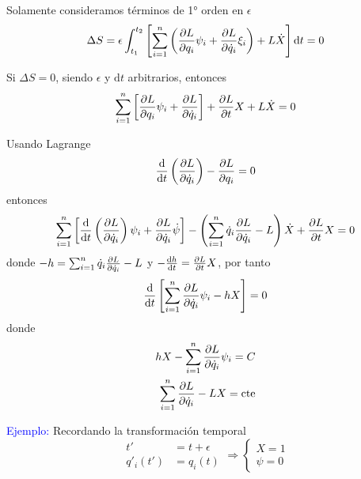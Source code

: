 \documentclass[../main]{subfiles}
\begin{document}
Solamente consideramos términos de 1° orden en $\epsilon$
\begin{equation}
    \Delta S=\epsilon \int_{t_1}^{t_2}\left[\sum_{i=1}^n\left(\pdv{L}{q_i}\psi_i+\pdv{L}{\dot{q}_i}\xi_i\right)+L\dot{X}\right]\mathrm{d}t=0
\end{equation}

Si $\Delta S=0$, siendo $\epsilon$ y $\mathrm{d}t$ arbitrarios, entonces 
\begin{equation}
    \sum_{i=1}^n \left[\pdv{L}{q_i}\psi_i+\pdv{L}{\dot{q}_i}(\dot{\psi}_i-\dot{q}_i \dot{X})\right]+\pdv{L}{t}X+L\dot{X}=0
\end{equation}

Usando Lagrange 
\begin{equation*}
    \dv{}{t}\left(\pdv{L}{\dot{q}_i}\right)-\pdv{L}{q_i}=0
\end{equation*}
entonces 
\begin{equation}
    \sum_{i=1}^n\left[\dv{}{t}\left(\pdv{L}{\dot{q}_i}\right)\psi_i+\pdv{L}{\dot{q}_i}\dot{\psi}\right]-\left(\sum_{i=1}^n \dot{q}_i\pdv{L}{\dot{q}_i}-L\right)\dot{X}+\pdv{L}{t}X=0
\end{equation}
donde $-h=\sum_{i=1}^n \dot{q}_i\pdv{L}{\dot{q}_i}-L$ y $-\dv{h}{t}=\pdv{L}{t}X$, por tanto 
\begin{equation}
    \dv{}{t}\left[\sum_{i=1}^n \pdv{L}{\dot{q}_i}\psi_i-hX\right]=0
\end{equation}
donde 
\begin{equation}
    \begin{split}
        hX-\sum_{i=1}^n \pdv{L}{\dot{q}_i}\psi_i=C\\
        \sum_{i=1}^n \pdv{L}{\dot{q}_i}(\dot{q}_i X-\psi_i)-LX=\text{cte}        
    \end{split}
\end{equation}

\textcolor{blue}{Ejemplo:} Recordando la transformación temporal 
\begin{equation}
    \begin{split}
        t'&=t+\epsilon\\
        q'_i(t')&=q_i(t)
    \end{split}
    \Rightarrow 
    \left\{
    \begin{array}{c}
        X=1\\
        \psi=0
    \end{array}
    \right.
\end{equation}
\end{document}
